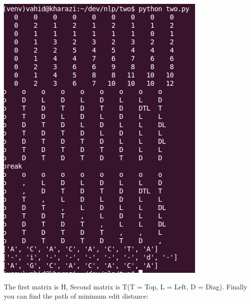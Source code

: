 \documentclass[paper=a4, fontsize=11pt]{scrartcl} %
\numberwithin{equation}{section} %
\numberwithin{figure}{section} %
\numberwithin{table}{section} %
\begin{document}
\includegraphics[scale=0.5]{test.png}
\centering
\begin{flushleft}
The first matrix is H, Second matrix is T(T = Top, L = Left, D = Diag). Finally you can find the path of minimum edit distance:

\begin{spverbatim}
['A', 'C', 'A', 'C', 'A', 'C', 'T', 'A']
['-', 'i', '-', '-', '-', '-', '-', 'd', '-']
['A', 'G', 'C', 'A', 'C', 'A', 'C', 'A']
\end{spverbatim}
\end{flushleft}
\end{document}
